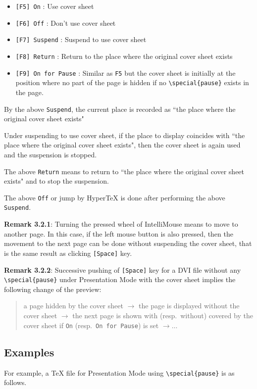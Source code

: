 \documentclass{article}
\begin{document}
\begin{enumerate}
\begin{itemize}
\item
{\tt [F5] On} : Use cover sheet
\item
{\tt [F6] Off} : Don't use cover sheet
\item
{\tt [F7] Suspend} : Suspend to use cover sheet
\item
{\tt [F8] Return} : Return to the place where the original cover sheet exists
\item
{\tt [F9] On for Pause} : Similar as {\tt F5} but the cover sheet is initially at the position where no part of the page is hidden if no \verb|\special{pause}| 
exists in the page.
\end{itemize}
By the above {\tt Suspend}, the current place is recorded as 
``the place where the original cover sheet exists"

Under suspending to use cover sheet, if the place to display coincides with 
``the place where the original cover sheet exists", then the cover sheet is 
again used and the suspension is stopped.

The above {\tt Return} means to return to ``the place where the original 
cover sheet exists" and to stop the suspension.

The above {\tt Off} or jump by {Hyper\TeX} is done after performing the 
above {\tt Suspend}.
\end{enumerate}

{\bf Remark 3.2.1}: Turning the pressed wheel of IntelliMouse means 
to move to another page.  
In this case, if the left mouse button is also pressed, then the movement to 
the next page can be done without suspending the cover sheet, that is the same 
result as clicking {\tt[Space]} key.  
\medskip

{\bf Remark 3.2.2}: Successive pushing of {\tt [Space]} key for a DVI file 
without any \verb|\special{pause}| under Presentation Mode with the cover 
sheet implies the following change of the preview:
\begin{quote}
a page hidden by the cover sheet $\to$ the page is displayed without the cover sheet 
$\to$ the next page is shown with (resp.~without) covered by the cover sheet if {\tt On} (resp.~{\tt On for Pause}) is set $\to\ldots$
\end{quote}

\subsection{Examples}
For example, a {\TeX} file for Presentation Mode using \verb|\special{pause}|
is as follows.
\end{document}
